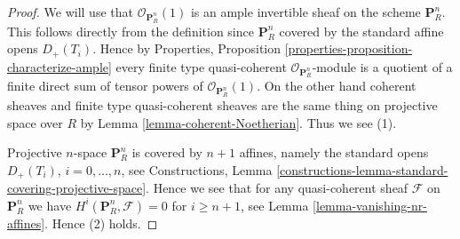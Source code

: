 \documentclass{stacks-project}
\theoremstyle{plain}
\theoremstyle{definition}
\theoremstyle{remark}
\numberwithin{equation}{subsection}
\begin{document}
\begin{proof}
We will use that $\mathcal{O}_{\mathbf{P}^n_R}(1)$ is an ample invertible
sheaf on
the scheme $\mathbf{P}^n_R$. This follows directly from the definition
since $\mathbf{P}^n_R$ covered by the standard affine opens $D_{+}(T_i)$.
Hence by
Properties, Proposition \ref{properties-proposition-characterize-ample}
every finite type quasi-coherent $\mathcal{O}_{\mathbf{P}^n_R}$-module
is a quotient of a finite direct sum of tensor powers of
$\mathcal{O}_{\mathbf{P}^n_R}(1)$. On the other hand coherent sheaves
and finite type quasi-coherent sheaves are the same thing on projective
space over $R$ by Lemma \ref{lemma-coherent-Noetherian}. Thus we see (1).

\medskip\noindent
Projective $n$-space $\mathbf{P}^n_R$ is covered by $n + 1$ affines,
namely the standard opens $D_{+}(T_i)$, $i = 0, \ldots, n$, see Constructions,
Lemma \ref{constructions-lemma-standard-covering-projective-space}.
Hence we see that for any quasi-coherent
sheaf $\mathcal{F}$ on $\mathbf{P}^n_R$
we have $H^i(\mathbf{P}^n_R, \mathcal{F}) = 0$ for $i \geq n + 1$,
see Lemma \ref{lemma-vanishing-nr-affines}. Hence (2) holds.


\end{proof}
\end{document}
